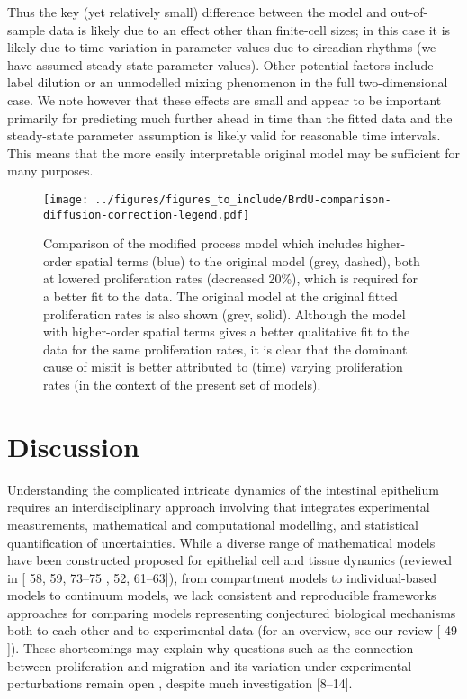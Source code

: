\documentclass[10pt,letterpaper]{article}
\providecommand{\DIFaddtex}[1]{{\protect\color{blue} \sf #1}} %
\providecommand{\DIFdeltex}[1]{{\protect\color{red} \scriptsize #1}} %
\providecommand{\DIFaddbegin}{} %
\providecommand{\DIFaddend}{} %
\providecommand{\DIFdelbegin}{} %
\providecommand{\DIFdelend}{} %
\providecommand{\DIFadd}[1]{\texorpdfstring{\DIFaddtex{#1}}{#1}} %
\providecommand{\DIFdel}[1]{\texorpdfstring{\DIFdeltex{#1}}{}} %
\begin{document}
Thus the key (yet relatively small) difference between the model and
out-of-sample data is likely due to an effect other than finite-cell
sizes; in this case it is likely due to time-variation in parameter
values due to circadian rhythms (we have assumed steady-state parameter
values). Other potential factors include label dilution or an unmodelled
mixing phenomenon in the full two-dimensional case. We note however that
these effects are small and appear to be important primarily for
predicting much further ahead in time than the fitted data and the
steady-state parameter assumption is likely valid for reasonable time
intervals. This means that the more easily interpretable original model
may be sufficient for many purposes.

\begin{figure}
\centering
\texttt{[image: ../figures/figures\_to\_include/BrdU-comparison-diffusion-correction-legend.pdf]}
\caption{Comparison of the modified process model which includes
higher-order spatial terms (blue) to the original model (grey, dashed),
both at lowered proliferation rates (decreased 20\%), which is required
for a better fit to the data. The original model at the original fitted
proliferation rates is also shown (grey, solid). Although the model with
higher-order spatial terms gives a better qualitative fit to the data
for the same proliferation rates, it is clear that the dominant cause of
misfit is better attributed to (time) varying proliferation rates (in
the context of the present set of
models).\label{fig:BrdU-comparison-diffusion-correction}}
\end{figure}

\section{Discussion}\label{discussion}

Understanding the \DIFdelbegin \DIFdel{complicated }\DIFdelend \DIFaddbegin \DIFadd{intricate }\DIFaddend dynamics of the intestinal epithelium
requires an interdisciplinary approach \DIFdelbegin \DIFdel{involving }\DIFdelend \DIFaddbegin \DIFadd{that integrates }\DIFaddend experimental
measurements, mathematical and computational modelling, and statistical
quantification of uncertainties. While a diverse range of mathematical
models have been \DIFdelbegin \DIFdel{constructed }\DIFdelend \DIFaddbegin \DIFadd{proposed }\DIFaddend for epithelial cell and tissue dynamics
(reviewed in {[}\DIFdelbegin \DIFdel{58, 59, 73--75}\DIFdelend \DIFaddbegin \DIFadd{51, 52, 61--63}\DIFaddend {]}), from compartment models to
individual-based models to continuum models, we lack consistent and
reproducible \DIFdelbegin \DIFdel{frameworks }\DIFdelend \DIFaddbegin \DIFadd{approaches }\DIFaddend for comparing models representing conjectured
biological mechanisms both to each other and to experimental data (for
an overview, see our review {[}\DIFdelbegin \DIFdel{49}\DIFdelend \DIFaddbegin \DIFadd{44}\DIFaddend {]}). These shortcomings may explain
why questions such as the connection between proliferation and migration
and its variation under experimental perturbations remain open
\DIFdelbegin \DIFdel{, despite
much investigation }\DIFdelend {[}8--14{]}.
\end{document}
